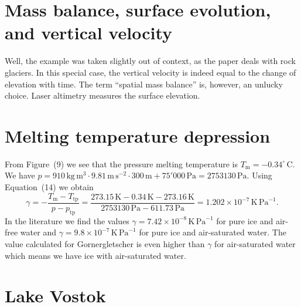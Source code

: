 \documentclass[parskip=half]{scrartcl}
\newcommand{\cels}[1]{\ensuremath{#1^{\circ}\,\mathrm{C}}}
\begin{document}
\section{Mass balance, surface evolution, and vertical velocity}

Well, the example was taken slightly out of context, as the paper deals with rock glaciers. In this special case, the vertical velocity is indeed equal to the change of elevation with time. The term ``spatial mass balance'' is, however, an unlucky choice. Laser altimetry measures the surface elevation.


\section{Melting temperature depression}

From Figure~(9) we see that the pressure melting temperature is $T_{\text{m}} = -\cels{0.34}$. We have $p = 910\,\text{kg}\,\text{m}^{3} \cdot 9.81\,\text{m}\,\text{s}^{-2}\cdot 300\,\text{m} + 75'000\,\text{Pa} = 2753130\,\text{Pa}$. Using Equation~(14) we obtain
  \begin{equation*}
    \gamma = -\frac{T_{\text{m}}-T_{\text{tp}}}{p - p_{\text{tp}}} = \frac{273.15\,\text{K} -0.34\,\text{K} -273.16\,\text{K}}{2753130\,\text{Pa} - 611.73\,\text{Pa}} = 1.202\times 10^{-7}\,\text{K}\,\text{Pa}^{-1}.
  \end{equation*} In the literature we find the values $\gamma = 7.42 \times 10^{-8} \,\text{K}\,\text{Pa}^{-1}$ for pure ice and air-free water and $\gamma = 9.8 \times 10^{-7} \,\text{K}\,\text{Pa}^{-1}$ for pure ice and air-saturated water. The value calculated for Gornergletscher is even higher than $\gamma$ for air-saturated water which means we have ice with air-saturated water.


\section{Lake Vostok}
\end{document}
